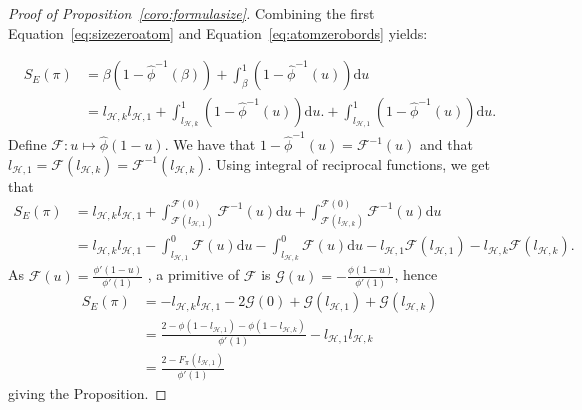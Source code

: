 \documentclass[11pt]{article}
\begin{document}
\begin{proof}[Proof of Proposition~\ref{coro:formulasize}]
Combining the first Equation~\ref{eq:sizezeroatom} and Equation~\ref{eq:atomzerobords} yields:

\begin{align*}
S_E(\pi)&=\beta(1-\hat{\phi}^{-1}(\beta)) + \int_{\beta}^{1}(1-\hat{\phi}^{-1}(u))\mathrm{d}u \\
&= l_{\mathcal{H},k}l_{\mathcal{H},1} + \int_{l_{\mathcal{H},k}}^{1}(1-\hat{\phi}^{-1}(u))\mathrm{d}u.+\int_{l_{\mathcal{H},1}}^1 (1-\hat{\phi}^{-1}(u))\mathrm{d}u.
\end{align*}
Define $\mathcal{F}: u \mapsto \hat{\phi}(1-u)$. We have that $1-\hat{\phi}^{-1}(u)=\mathcal{F}^{-1}(u)$ and that $l_{\mathcal{H},1}=\mathcal{F}(l_{\mathcal{H},k})=\mathcal{F}^{-1}(l_{\mathcal{H},k})$.
Using integral of reciprocal functions, we get that
\begin{align*}
    S_E(\pi)&=l_{\mathcal{H},k}l_{\mathcal{H},1} + \int_{\mathcal{F}(l_{\mathcal{H},1})}^{\mathcal{F}(0)} \mathcal{F}^{-1}(u)\mathrm{d}u+\int_{\mathcal{F}(l_{\mathcal{H},k})}^{\mathcal{F}(0)} \mathcal{F}^{-1}(u)\mathrm{d}u \\
    &= l_{\mathcal{H},k}l_{\mathcal{H},1}  - \int_{l_{\mathcal{H},1}}^0 \mathcal{F}(u)\mathrm{d}u - \int_{l_{\mathcal{H},k}}^{0}\mathcal{F}(u)\mathrm{d}u-l_{\mathcal{H},1}\mathcal{F}(l_{\mathcal{H},1})-l_{\mathcal{H},k}\mathcal{F}(l_{\mathcal{H},k}).
\end{align*}
As $\mathcal{F}(u)=\frac{\phi'(1-u)}{\phi'(1)}$ , a primitive of $\mathcal{F}$ is $\mathcal{G}(u)=-\frac{\phi(1-u)}{\phi'(1)}$, hence
\begin{align*}
    S_E(\pi)&= -l_{\mathcal{H},k}l_{\mathcal{H},1} -2\mathcal{G}(0)+\mathcal{G}(l_{\mathcal{H},1})+\mathcal{G}(l_{\mathcal{H},k}) \\
    &=\frac{2-\phi(1-l_{\mathcal{H},1})-\phi(1-l_{\mathcal{H},k})}{\phi'(1)}-l_{\mathcal{H},1}l_{\mathcal{H},k} \\
    &= \frac{2-F_\pi(l_{\mathcal{H},1})}{\phi'(1)}
\end{align*}
giving the Proposition.
\end{proof}
\end{document}
